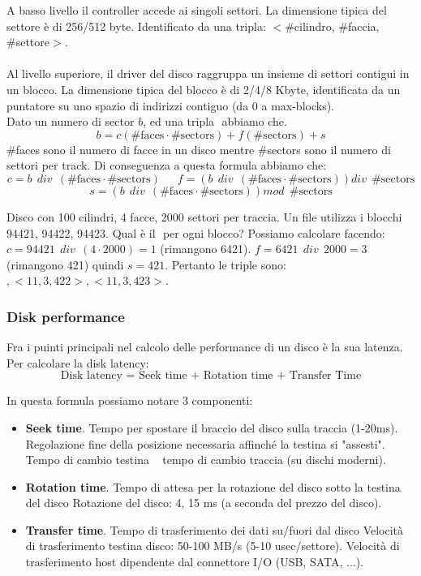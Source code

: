 \hspace{-15pt}A basso livello il controller accede ai singoli settori. La dimensione tipica del settore è di 256/512 byte. 
Identificato da una tripla: \(<\)\#cilindro, \#faccia, \#settore\(>\).\\\\
Al livello superiore, il driver del disco raggruppa un insieme di settori contigui in un blocco. La dimensione tipica del blocco è di 2/4/8 Kbyte, 
identificata da un puntatore su uno spazio di indirizzi contiguo (da 0 a max-blocks).\\
Dato un numero di sector \(b\), ed una tripla \(<c,f,s>\) abbiamo che.
\[b = c(\text{\#faces} \cdot \text{\#sectors}) + f(\text{\#sectors}) + s\]
\#faces sono il numero di facce in un disco mentre \#sectors sono il numero di settori per track. Di conseguenza a questa formula
abbiamo che:
\[c = b \:\: div \:\: (\text{\#faces} \cdot \text{\#sectors}) \hspace{18pt} f = (b \:\: div \:\: (\text{\#faces} \cdot \text{\#sectors}))div \:\: \text{\#sectors}\]
\[s = (b \:\: div \:\: (\text{\#faces} \cdot \text{\#sectors}))mod \:\: \text{\#sectors}\]

\begin{example}
    Disco con 100 cilindri, 4 facce, 2000 settori per traccia. Un file utilizza i blocchi 94421, 94422, 94423. Qual è il \(<c,f,s>\) per ogni blocco?
    Possiamo calcolare facendo:\\ \(c = 94421 \:\: div \:\: (4 \cdot 2000) = 1\) (rimangono 6421). \(f = 6421 \:\: div \:\: 2000 = 3\) (rimangono 421) quindi \(s = 421\).
    Pertanto le triple sono: \(<11, 2, 421>, <11, 3, 422>, <11, 3, 423>\).
\end{example}

\subsubsection{Disk performance}
Fra i puinti principali nel calcolo delle performance di un disco è la sua latenza. Per calcolare la disk latency:
\[\text{Disk latency = Seek time + Rotation time + Transfer Time}\]

\hspace{-15pt}In questa formula possiamo notare 3 componenti:
\begin{itemize}
    \item \textbf{Seek time}. Tempo per spostare il braccio del disco sulla traccia (1-20ms). Regolazione fine della posizione necessaria affinché la testina si "assesti". Tempo di cambio testina ~ tempo di cambio traccia (su dischi moderni).
    \item \textbf{Rotation time}. Tempo di attesa per la rotazione del disco sotto la testina del disco Rotazione del disco: 4, 15 ms (a seconda del prezzo del disco).
    \item \textbf{Transfer time}. Tempo di trasferimento dei dati su/fuori dal disco Velocità di trasferimento testina disco: 50-100 MB/s (5-10 usec/settore). Velocità di trasferimento host dipendente dal connettore I/O (USB, SATA, ...).
\end{itemize}

